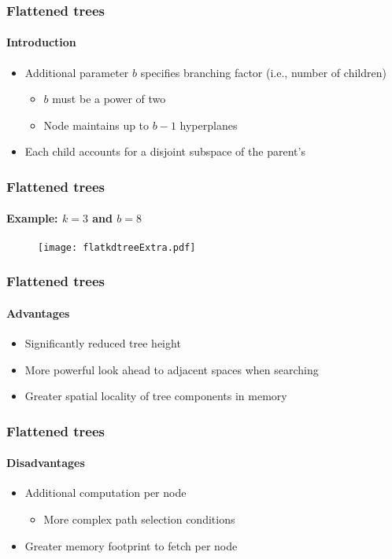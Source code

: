 
\begin{frame}
  \frametitle{Flattened \kd trees}
  \framesubtitle{Introduction}

  \begin{itemize}
    \item Additional parameter $b$ specifies branching factor (i.e., number of children)
      \begin{itemize}
        \item $b$ must be a power of two
        \item Node maintains up to $b-1$ hyperplanes 
      \end{itemize}
    \item Each child accounts for a disjoint subspace of the parent's
  \end{itemize}
\end{frame}

\begin{frame}
  \frametitle{Flattened \kd trees}
  \framesubtitle{Example: $k=3$ and $b=8$}
  
  \begin{figure}
    \centering
    \texttt{[image: flatkdtreeExtra.pdf]}
  \end{figure}
\end{frame}

\begin{frame}
  \frametitle{Flattened \kd trees}
  \framesubtitle{Advantages}

  \begin{itemize}
    \item Significantly reduced tree height
    \item More powerful look ahead to adjacent spaces when searching
    \item Greater spatial locality of tree components in memory
  \end{itemize}
\end{frame}

\begin{frame}
  \frametitle{Flattened \kd trees}
  \framesubtitle{Disadvantages}

  \begin{itemize}
    \item Additional computation per node 
      \begin{itemize}
        \item More complex path selection conditions
      \end{itemize}
    \item Greater memory footprint to fetch per node
  \end{itemize}
\end{frame}

